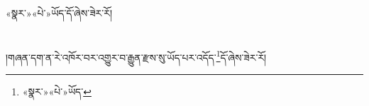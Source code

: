 {«སྣར་»«པེ་»ཡོད་}དོ་ཞེས་ཟེར་རོ།\chapter{ }།གཞན་དག་ན་རེ་འཁོར་བར་འགྱུར་བ་རྒྱུན་རྫས་སུ་ཡོད་པར་འདོད་\footnote{«སྣར་»«པེ་»ཡོད་}དོ་ཞེས་ཟེར་རོ།